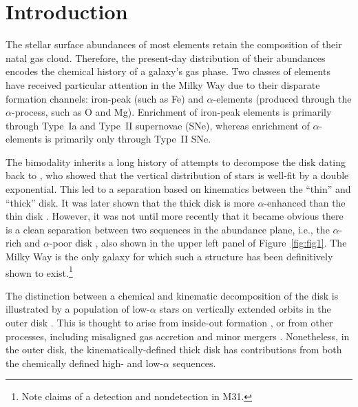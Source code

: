 \documentclass[twocolumn]{aastex631}
\begin{document}
\section{Introduction}\label{sec:intro}
The stellar surface abundances of most elements retain the composition of their natal gas cloud. Therefore, the present-day distribution of their abundances encodes the chemical history of a galaxy's gas phase. Two classes of elements have received particular attention in the Milky Way due to their disparate formation channels: iron-peak (such as Fe) and $\alpha$-elements (produced through the $\alpha$-process, such as O and Mg). Enrichment of iron-peak elements is primarily through Type~Ia and Type~II supernovae (SNe), whereas enrichment of $\alpha$-elements is primarily only through Type~II SNe.

The bimodality inherits a long history of attempts to decompose the disk dating back to \citet{1983MNRAS.202.1025G}, who showed that the vertical distribution of stars is well-fit by a double exponential. This led to a separation based on kinematics between the ``thin'' and ``thick'' disk. It was later shown that the thick disk is more $\alpha$-enhanced than the thin disk \citep{1996ASPC...92..307G,1998A&A...338..161F,2004AN....325....3F,2006MNRAS.367.1329R}. However, it was not until more recently that it became obvious there is a clean separation between two sequences in the abundance plane, i.e., the $\alpha$-rich and $\alpha$-poor disk \citep{2011A&A...535L..11A,2012A&A...545A..32A,2014A&A...562A..71B,2014ApJ...796...38N,2020MNRAS.493.2952H}, also shown in the upper left panel of Figure~\ref{fig:fig1}. The Milky Way is the only galaxy for which such a structure has been definitively shown to exist.\footnote{Note claims of a detection \citep{2023ApJ...956L..14K} and nondetection \citep{2024IAUS..377..115N} in M31.}

The distinction between a chemical and kinematic decomposition of the disk is illustrated by a population of low-$\alpha$ stars on vertically extended orbits in the outer disk \citep{2015ApJ...808..132H,2016ApJ...823...30B}. This is thought to arise from inside-out formation \citep[which predict and claim a negative age gradient at high altitude]{2015ApJ...804L...9M,2016ApJ...831..139M}, or from other processes, including misaligned gas accretion and minor mergers \citep{2010MNRAS.408..783R,2009MNRAS.396..696S}. Nonetheless, in the outer disk, the kinematically-defined thick disk has contributions from both the chemically defined high- and low-$\alpha$ sequences.
\end{document}
